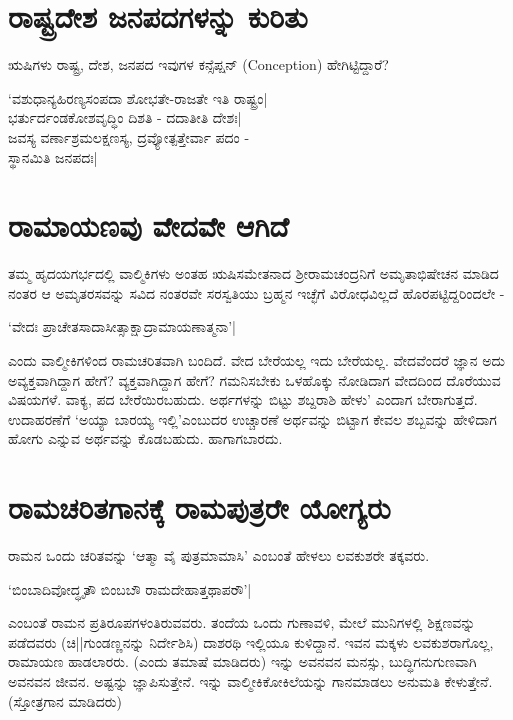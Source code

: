 \section*{ರಾಷ್ಟ್ರದೇಶ ಜನಪದಗಳನ್ನು ಕುರಿತು}

ಋಷಿಗಳು ರಾಷ್ಟ್ರ, ದೇಶ, ಜನಪದ ಇವುಗಳ ಕನ್ಸೆಪ್ಷನ್ ({\eng Conception}) ಹೇಗಿಟ್ಟಿದ್ದಾರೆ?

\begin{shloka}
`ವಶುಧಾನ್ಯಹಿರಣ್ಯಸಂಪದಾ ಶೋಭತೇ-ರಾಜತೇ ಇತಿ ರಾಷ್ಟ್ರಂ|\\
ಭರ್ತುರ್ದಂಡಕೋಶವೃದ್ಧಿಂ ದಿಶತಿ - ದದಾತೀತಿ ದೇಶಃ|\\
ಜವಸ್ಯ ವರ್ಣಾಶ್ರಮಲಕ್ಷಣಸ್ಯ, ದ್ರವ್ಯೋತ್ಪತ್ತೇರ್ವಾ ಪದಂ -\\
ಸ್ಥಾನಮಿತಿ ಜನಪದಃ|
\end{shloka}

\section*{ರಾಮಾಯಣವು ವೇದವೇ ಆಗಿದೆ}

ತಮ್ಮ ಹೃದಯಗರ್ಭದಲ್ಲಿ ವಾಲ್ಮಿಕಿಗಳು ಅಂತಹ ಋಷಿಸಮೇತನಾದ ಶ್ರೀರಾಮಚಂದ್ರನಿಗೆ ಅಮೃತಾಭಿಷೇಚನ ಮಾಡಿದ ನಂತರ ಆ ಅಮೃತರಸವನ್ನು ಸವಿದ ನಂತರವೇ ಸರಸ್ವತಿಯು ಬ್ರಹ್ಮನ ಇಚ್ಛೆಗೆ ವಿರೋಧವಿಲ್ಲದೆ ಹೊರಪಟ್ಟಿದ್ದರಿಂದಲೇ -

\begin{shloka}
`ವೇದಃ ಪ್ರಾಚೇತಸಾದಾಸೀತ್ಸಾಕ್ಷಾದ್ರಾಮಾಯಣಾತ್ಮನಾ'|
\end{shloka}
ಎಂದು ವಾಲ್ಮೀಕಿಗಳಿಂದ ರಾಮಚರಿತವಾಗಿ ಬಂದಿದೆ. ವೇದ ಬೇರೆಯಲ್ಲ ಇದು ಬೇರೆಯಲ್ಲ. ವೇದವೆಂದರೆ ಜ್ಞಾನ ಅದು ಅವ್ಯಕ್ತವಾಗಿದ್ದಾಗ ಹೇಗೆ? ವ್ಯಕ್ತವಾಗಿದ್ದಾಗ ಹೇಗೆ? ಗಮನಿಸಬೇಕು ಒಳಹೊಕ್ಕು ನೋಡಿದಾಗ ವೇದದಿಂದ ದೊರೆಯುವ ವಿಷಯಗಳೆ. ವಾಕ್ಯ, ಪದ ಬೇರೆಯಿರಬಹುದು. ಅರ್ಥಗಳನ್ನು ಬಿಟ್ಟು ಶಬ್ದರಾಶಿ ಹೇಳು' ಎಂದಾಗ ಬೇರಾಗುತ್ತದೆ. ಉದಾಹರಣೆಗೆ `ಅಯ್ಯಾ ಬಾರಯ್ಯ ಇಲ್ಲಿ'ಎಂಬುದರ ಉಚ್ಚಾರಣೆ ಅರ್ಥವನ್ನು ಬಿಟ್ಟಾಗ ಕೇವಲ ಶಬ್ಬವನ್ನು ಹೇಳಿದಾಗ ಹೋಗು ಎನ್ನುವ ಅರ್ಥವನ್ನು ಕೊಡಬಹುದು. ಹಾಗಾಗಬಾರದು.

\section*{ರಾಮಚರಿತಗಾನಕ್ಕೆ ರಾಮಪುತ್ರರೇ ಯೋಗ್ಯರು}

ರಾಮನ ಒಂದು ಚರಿತವನ್ನು `ಆತ್ಮಾ ವೈ ಪುತ್ರಮಾಮಾಸಿ' ಎಂಬಂತೆ ಹೇಳಲು ಲವಕುಶರೇ ತಕ್ಕವರು.

\begin{shloka}
`ಬಿಂಬಾದಿವೋದ್ಧೃತೌ ಬಿಂಬಬೌ ರಾಮದೇಹಾತ್ತಥಾಪರೌ'|
\end{shloka}
ಎಂಬಂತೆ ರಾಮನ ಪ್ರತಿರೂಪಗಳಂತಿರುವವರು. ತಂದೆಯ ಒಂದು ಗುಣಾವಳಿ, ಮೇಲೆ ಮುನಿಗಳಲ್ಲಿ ಶಿಕ್ಷಣವನ್ನು ಪಡೆದವರು (ಚಿ||ಗುಂಡಣ್ಣನನ್ನು ನಿರ್ದೇಶಿಸಿ) ದಾಶರಥಿ ಇಲ್ಲಿಯೂ ಕುಳಿದ್ದಾನೆ. ಇವನ ಮಕ್ಕಳು ಲವಕುಶರಾಗೊಲ್ಲ, ರಾಮಾಯಣ ಹಾಡಲಾರರು. (ಎಂದು ತಮಾಷೆ ಮಾಡಿದರು) ಇನ್ನು ಅವನವನ ಮನಸ್ಸು, ಬುದ್ಧಿಗನುಗುಣವಾಗಿ ಅವನವನ ಜೀವನ. ಅಷ್ಟನ್ನು ಜ್ಞಾಪಿಸುತ್ತೇನೆ. ಇನ್ನು ವಾಲ್ಮೀಕಿಕೋಕಿಲೆಯನ್ನು ಗಾನಮಾಡಲು ಅನುಮತಿ ಕೇಳುತ್ತೇನೆ. (ಸ್ತೋತ್ರಗಾನ ಮಾಡಿದರು)

